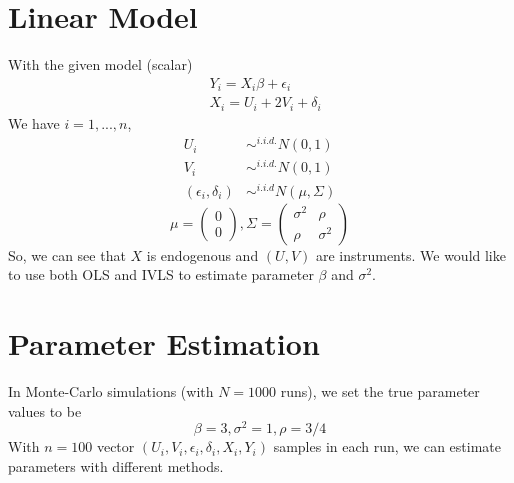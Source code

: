\documentclass{article}
\begin{document}
\section*{Linear Model}

\hspace{12 pt} With the given model (scalar)
\begin{equation}
\begin{split}
&Y_i = X_i\beta + \epsilon_i \\
&X_i = U_i + 2V_i + \delta_i
\end{split}
\end{equation}
We have $i=1,...,n$,
\begin{equation}
\begin{split}
U_i &\sim^{i.i.d.} N(0, 1)\\
V_i &\sim^{i.i.d.} N(0,1) \\
(\epsilon_i, \delta_i) &\sim^{i.i.d} N(\mu, \Sigma)
\end{split}
\end{equation}
\begin{displaymath}
\mu =
  \begin{pmatrix}
  0 \\
  0
  \end{pmatrix}
, \Sigma = 
  \begin{pmatrix}
  \sigma^2 & \rho \\
  \rho         & \sigma^2
  \end{pmatrix}
\end{displaymath}
So, we can see that $X$ is endogenous and $(U,V)$ are instruments. We
would like to use both OLS and IVLS to estimate parameter $\beta$ and
$\sigma^2$.



\section*{Parameter Estimation}
\hspace{12 pt} In Monte-Carlo simulations (with $N=1000$ runs),
we set the true parameter values to be 
\begin{displaymath}
\beta = 3, \sigma^2 = 1, \rho= 3/4
\end{displaymath}
With $n = 100$ vector $(U_i, V_i, \epsilon_i, \delta_i, X_i,
Y_i)$ samples in each run, we can estimate parameters with different
methods.

\end{document}
